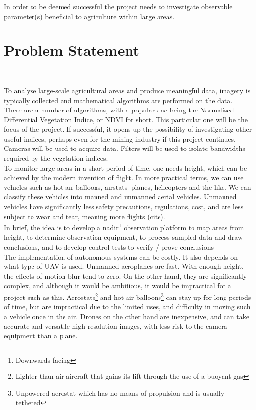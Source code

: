 In order to be deemed successful the project needs to investigate observable parameter(s) beneficial to agriculture within large areas.

\section{Problem Statement}\

To analyse large-scale agricultural areas and produce meaningful data, imagery is typically collected and mathematical algorithms are performed on the data. There are a number of algorithms, with a popular one being the Normalised Differential Vegetation Indice, or NDVI for short. This particular one will be the focus of the project. If successful, it opens up the possibility of investigating other useful indices, perhaps even for the mining industry if this project continues.\\

Cameras will be used to acquire data. Filters will be used to isolate bandwidths required by the vegetation indices.\\

To monitor large areas in a short period of time, one needs height, which can be achieved by the modern invention of flight. In more practical terms, we can use vehicles such as hot air balloons, airstats, planes, helicopters and the like. We can classify these vehicles into manned and unmanned aerial vehicles. Unmanned vehicles have significantly less safety precautions, regulations, cost, and are less subject to wear and tear, meaning more flights (cite).\\

In brief, the idea is to develop a nadir\footnote{Downwards facing} observation platform to map areas from height, to determine observation equipment, to process sampled data and draw conclusions, and to develop control tests to verify / prove conclusions\\

The implementation of autonomous systems can be costly. It also depends on what type of UAV is used. Unmanned aeroplanes  are fast. With enough height, the effects of motion blur tend to zero. On the other hand, they are significantly complex, and although it would be ambitious, it would be impractical for a project such as this. Aerostats\footnote{Lighter than air aircraft that gains its lift through the use of a buoyant gas} and hot air balloons\footnote{Unpowered aerostat which has no means of propulsion and is usually tethered} can stay up for long periods of time, but are impractical due to the limited uses, and difficulty in moving such a vehicle once in the air. Drones on the other hand are inexpensive, and can take accurate and versatile high resolution images, with less risk to the camera equipment than a plane.\\

